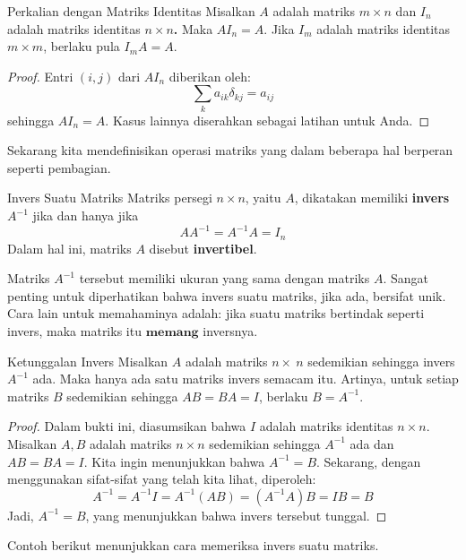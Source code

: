 \begin{lemma}{Perkalian dengan Matriks Identitas}\label{lem:multbyidentity}
Misalkan $A$ adalah matriks $m\times n$ dan $I_{n}$ adalah matriks identitas
$n\times n$\textbf{.} Maka $AI_{n}=A.$ Jika $I_{m}$ adalah matriks identitas
$m\times m$, berlaku pula $I_{m}A=A.$
\end{lemma}

\ifdefined\showproofs
\begin{proof}
Entri $(i,j)$ dari $AI_n$ diberikan oleh:
\begin{equation*}
\sum_{k}a_{ik}\delta _{kj}=a_{ij}
\end{equation*}
sehingga $AI_{n}=A.$ Kasus lainnya diserahkan sebagai latihan untuk Anda. 
\end{proof}
\fi
Sekarang kita mendefinisikan operasi matriks yang dalam beberapa hal berperan seperti pembagian. 

\begin{definition}{Invers Suatu Matriks}\label{def:invertiblematrix}
Matriks persegi $n\times n$, yaitu $A$, dikatakan memiliki \textbf{invers} $A^{-1}$
jika dan hanya jika
\begin{equation*}
AA^{-1}=A^{-1}A=I_n
\end{equation*}
Dalam hal ini, matriks $A$ disebut
 \textbf{invertibel}.
\end{definition}

Matriks $A^{-1}$ tersebut memiliki ukuran yang sama dengan matriks $A$.
Sangat penting untuk diperhatikan bahwa invers suatu matriks, jika ada,
bersifat unik. Cara lain untuk memahaminya adalah: jika suatu matriks bertindak seperti invers,
maka matriks itu $\textbf{memang}$ inversnya.

\begin{theorem}{Ketunggalan Invers}\label{thm:uniqueinverse}
Misalkan $A$ adalah matriks $n \times\ n$ sedemikian sehingga invers $A^{-1}$ ada. Maka hanya ada satu
matriks invers semacam itu.
Artinya, untuk setiap matriks $B$ sedemikian sehingga $AB=BA=I$, berlaku $B=A^{-1}$.
\end{theorem}

\ifdefined\showproofs
\begin{proof} Dalam bukti ini, diasumsikan bahwa $I$ adalah matriks identitas $n \times n$.
Misalkan $A, B$ adalah matriks $n \times n$ sedemikian sehingga $A^{-1}$ ada dan $AB=BA=I$.
Kita ingin menunjukkan bahwa $A^{-1} = B$.
Sekarang, dengan menggunakan sifat-sifat yang telah kita lihat, diperoleh:
\begin{equation*}
A^{-1}=A^{-1}I=A^{-1}\left( AB\right) =\left( A^{-1}A\right) B=IB=B
\end{equation*}
Jadi, $A^{-1} = B$, yang menunjukkan bahwa invers tersebut tunggal.
\end{proof}
\fi
Contoh berikut menunjukkan cara memeriksa invers suatu matriks. 

